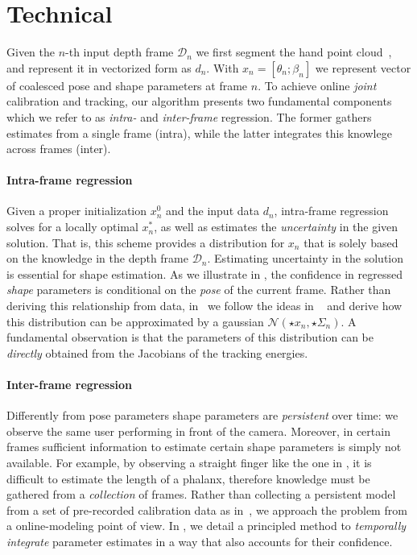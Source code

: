 \section{Technical}
Given the $n$-th input depth frame $\mathcal{D}_n$ we first segment the hand point cloud~\cite{htrack}, and represent it in vectorized form as $d_n$. With $x_n = [\theta_n; \beta_n]$ we represent vector of coalesced pose and shape parameters at frame $n$. To achieve online \emph{joint} calibration and tracking, our algorithm presents two fundamental components which we refer to as \emph{intra-} and \emph{inter-frame} regression. The former gathers estimates from a single frame (intra), while the latter integrates this knowlege across frames (inter).  
% 


\paragraph{Intra-frame regression}
Given a proper initialization $x_n^0$ and the input data $d_n$, intra-frame regression solves for a locally optimal $x_n^*$, as well as estimates the \emph{uncertainty} in the given solution. That is, this scheme provides a distribution for $x_n$ that is solely based on the knowledge in the depth frame $\mathcal{D}_n$.
Estimating uncertainty in the solution is essential for shape estimation. As we illustrate in , the confidence in regressed \emph{shape} parameters is conditional on the \emph{pose} of the current frame.
Rather than deriving this relationship from data, in~ we follow the ideas in ~ and derive how this distribution can be approximated by a gaussian $\mathcal{N}(\star{x}_n, \star{\Sigma}_n)$. A fundamental observation is that the parameters of this distribution can be \emph{directly} obtained from the Jacobians of the tracking energies.


\paragraph{Inter-frame regression}
Differently from pose parameters shape parameters are \emph{persistent} over time: we observe the same user performing in front of the camera. Moreover, in certain frames sufficient information to estimate certain shape parameters is simply not available. For example, by observing a straight finger like the one in , it is difficult to estimate the length of a phalanx, therefore knowledge must be gathered from a \emph{collection} of frames. Rather than collecting a persistent model from a set of pre-recorded calibration data as in~\cite{taylor_sig16}, we approach the problem from a online-modeling point of view. In , we detail a principled method to \emph{temporally integrate} parameter estimates in a way that also accounts for their confidence.

